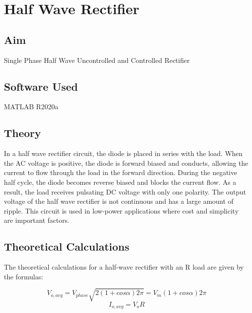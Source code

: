 \chapter{Half Wave Rectifier}
\vspace{-1cm}

\section{Aim}
\hspace{1cm}Single Phase Half Wave Uncontrolled and Controlled Rectifier

\section{Software Used}
\hspace{1cm}MATLAB R2020a
\section{Theory}
\hspace{\parindent}

In a half wave rectifier circuit, the diode is placed in series with the load. When the AC voltage is positive, the diode is forward biased and conducts, allowing the current to flow through the load in the forward direction. During the negative half cycle, the diode becomes reverse biased and blocks the current flow. As a result, the load receives pulsating DC voltage with only one polarity. The output voltage of the half wave rectifier is not continuous and has a large amount of ripple. This circuit is used in low-power applications where cost and simplicity are important factors.



\section{Theoretical Calculations}
\hspace{\parindent}
The theoretical calculations for a half-wave rectifier with an R load are given by the formulas:


$$
    V_{o,avg} =
    V_{phase}
    \sqrt{2(1 + cos\alpha)2\pi} =
    V_m(1 + cos\alpha)
    2\pi
$$
$$
    I_{o,avg} =
    V_oR
$$

